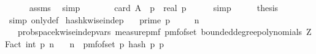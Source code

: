 \begin{isabellebody}
\ \ \ \ \isamarkupfalse%
\ assms{\isacharparenleft}{\kern0pt}{}{\isacharparenright}{\kern0pt}\ \isamarkupfalse%
\ simp\isanewline
\ \ \isamarkupfalse%
\ \isamarkupfalse%
\ {\isachardoublequoteopen}{\isachardot}{\kern0pt}{\isachardot}{\kern0pt}{\isachardot}{\kern0pt}\ {\isacharequal}{\kern0pt}\ card\ {\isacharparenleft}{\kern0pt}A\ {\isasyminter}\ {\isacharbraceleft}{\kern0pt}{}{\isachardot}{\kern0pt}{\isachardot}{\kern0pt}{\isacharless}{\kern0pt}p{\isacharbraceright}{\kern0pt}{\isacharparenright}{\kern0pt}\ {\isacharslash}{\kern0pt}\ real\ p{\isachardoublequoteclose}\isanewline
\ \ \ \ \isamarkupfalse%
\ simp\isanewline
\ \ \isamarkupfalse%
\ \isamarkupfalse%
\ {\isacharquery}{\kern0pt}thesis\isanewline
\ \ \ \ \isamarkupfalse%
\ {\isacharparenleft}{\kern0pt}simp\ only{\isacharcolon}{\kern0pt}{\isasymOmega}{\isacharunderscore}{\kern0pt}def{\isacharparenright}{\kern0pt}\isanewline
{}\isamarkupfalse%
%
\endisatagproof
{\isafoldproof}%
%
\isadelimproof
\isanewline
%
\endisadelimproof
\isanewline
{}\isamarkupfalse%
\ hash{\isacharunderscore}{\kern0pt}k{\isacharunderscore}{\kern0pt}wise{\isacharunderscore}{\kern0pt}indep{\isacharcolon}{\kern0pt}\isanewline
\ \ \ {\isachardoublequoteopen}prime\ p{\isachardoublequoteclose}\isanewline
\ \ \ {\isachardoublequoteopen}{}\ {\isasymle}\ n{\isachardoublequoteclose}\isanewline
\ \ \ {\isachardoublequoteopen}prob{\isacharunderscore}{\kern0pt}space{\isachardot}{\kern0pt}k{\isacharunderscore}{\kern0pt}wise{\isacharunderscore}{\kern0pt}indep{\isacharunderscore}{\kern0pt}vars\ {\isacharparenleft}{\kern0pt}measure{\isacharunderscore}{\kern0pt}pmf\ {\isacharparenleft}{\kern0pt}pmf{\isacharunderscore}{\kern0pt}of{\isacharunderscore}{\kern0pt}set\ {\isacharparenleft}{\kern0pt}bounded{\isacharunderscore}{\kern0pt}degree{\isacharunderscore}{\kern0pt}polynomials\ {\isacharparenleft}{\kern0pt}ZFact\ {\isacharparenleft}{\kern0pt}int\ p{\isacharparenright}{\kern0pt}{\isacharparenright}{\kern0pt}\ n{\isacharparenright}{\kern0pt}{\isacharparenright}{\kern0pt}{\isacharparenright}{\kern0pt}\isanewline
\ \ \ n\ {\isacharparenleft}{\kern0pt}{\isasymlambda}{\isacharunderscore}{\kern0pt}{\isachardot}{\kern0pt}\ pmf{\isacharunderscore}{\kern0pt}of{\isacharunderscore}{\kern0pt}set\ {\isacharbraceleft}{\kern0pt}{}{\isachardot}{\kern0pt}{\isachardot}{\kern0pt}{\isacharless}{\kern0pt}p{\isacharbraceright}{\kern0pt}{\isacharparenright}{\kern0pt}\ {\isacharparenleft}{\kern0pt}hash\ p{\isacharparenright}{\kern0pt}\ {\isacharbraceleft}{\kern0pt}{}{\isachardot}{\kern0pt}{\isachardot}{\kern0pt}{\isacharless}{\kern0pt}p{\isacharbraceright}{\kern0pt}{\isachardoublequoteclose}\isanewline

\end{isabellebody}
